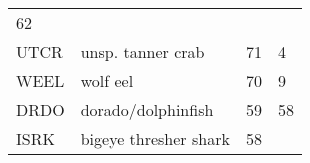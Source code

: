 \documentclass[]{article}
\begin{document}
\begin{longtable}[c]{@{}llll@{}}
\begin{minipage}[t]{0.23\columnwidth}
62
\end{minipage}
\\\addlinespace
\begin{minipage}[t]{0.08\columnwidth}\raggedright
UTCR
\end{minipage} & \begin{minipage}[t]{0.36\columnwidth}\raggedright
unsp. tanner crab
\end{minipage} & \begin{minipage}[t]{0.21\columnwidth}\raggedright
71
\end{minipage} & \begin{minipage}[t]{0.23\columnwidth}\raggedright
4
\end{minipage}
\\\addlinespace
\begin{minipage}[t]{0.08\columnwidth}\raggedright
WEEL
\end{minipage} & \begin{minipage}[t]{0.36\columnwidth}\raggedright
wolf eel
\end{minipage} & \begin{minipage}[t]{0.21\columnwidth}\raggedright
70
\end{minipage} & \begin{minipage}[t]{0.23\columnwidth}\raggedright
9
\end{minipage}
\\\addlinespace
\begin{minipage}[t]{0.08\columnwidth}\raggedright
DRDO
\end{minipage} & \begin{minipage}[t]{0.36\columnwidth}\raggedright
dorado/dolphinfish
\end{minipage} & \begin{minipage}[t]{0.21\columnwidth}\raggedright
59
\end{minipage} & \begin{minipage}[t]{0.23\columnwidth}\raggedright
58
\end{minipage}
\\\addlinespace
\begin{minipage}[t]{0.08\columnwidth}\raggedright
ISRK
\end{minipage} & \begin{minipage}[t]{0.36\columnwidth}\raggedright
bigeye thresher shark
\end{minipage} & \begin{minipage}[t]{0.21\columnwidth}\raggedright
58
\end{minipage} & \begin{minipage}[t]{0.23\columnwidth}\raggedright

\end{minipage}
\end{longtable}
\end{document}
